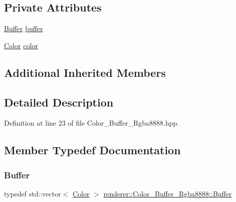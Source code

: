 \subsection*{Private Attributes}
\begin{DoxyCompactItemize}
\item 
\mbox{\hyperlink{classrenderer_1_1_color___buffer___rgba8888_a248c7412d48617fba678f54cd0417b8d}{Buffer}} \mbox{\hyperlink{classrenderer_1_1_color___buffer___rgba8888_acfc34bd2581783f762947288575df15f}{buffer}}
\item 
\mbox{\hyperlink{structrenderer_1_1_color___buffer___rgba8888_1_1_color}{Color}} \mbox{\hyperlink{classrenderer_1_1_color___buffer___rgba8888_ac56a7f51930995250260ca7b55681295}{color}}
\end{DoxyCompactItemize}
\subsection*{Additional Inherited Members}


\subsection{Detailed Description}


Definition at line 23 of file Color\+\_\+\+Buffer\+\_\+\+Rgba8888.\+hpp.



\subsection{Member Typedef Documentation}
\mbox{\label{classrenderer_1_1_color___buffer___rgba8888_a248c7412d48617fba678f54cd0417b8d}} 
\subsubsection{\texorpdfstring{Buffer}{Buffer}}
{\footnotesize\ttfamily typedef std\+::vector$<$ \mbox{\hyperlink{structrenderer_1_1_color___buffer___rgba8888_1_1_color}{Color}} $>$ \mbox{\hyperlink{classrenderer_1_1_color___buffer___rgba8888_a248c7412d48617fba678f54cd0417b8d}{renderer\+::\+Color\+\_\+\+Buffer\+\_\+\+Rgba8888\+::\+Buffer}}}



